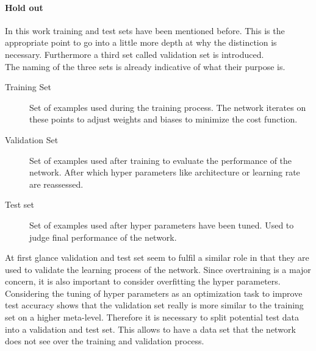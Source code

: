 				\paragraph{Hold out}
					In this work training and test sets have been mentioned before. This is the appropriate point to go into a little more depth at why the distinction is necessary. Furthermore a third set called validation set is introduced.\\
					The naming of the three sets is already indicative of what their purpose is.
					\begin{description}
						\item[Training Set] Set of examples used during the training process. The network iterates on these points to adjust weights and biases to minimize the cost function.
						\item[Validation Set] Set of examples used after training to evaluate the performance of the network. After which hyper parameters like architecture or learning rate are reassessed.
						\item[Test set] Set of examples used after hyper parameters have been tuned. Used to judge final performance of the network.
					\end{description}
					At first glance validation and test set seem to fulfil a similar role in that they are used to validate the learning process of the network. Since overtraining is a major concern, it is also important to consider overfitting the hyper parameters. Considering the tuning of hyper parameters as an optimization task to improve test accuracy shows that the validation set really is more similar to the training set on a higher meta-level. Therefore it is necessary to split potential test data into a validation and test set. This allows to have a data set that the network does not see over the training and validation process.
